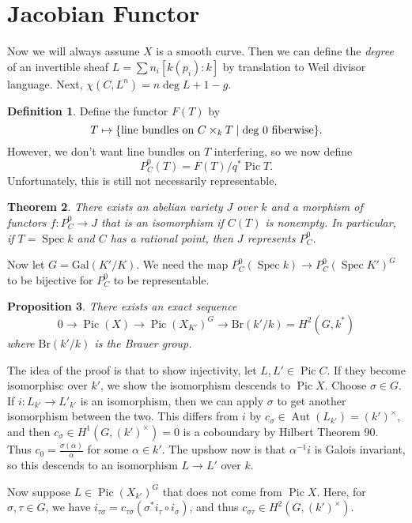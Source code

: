 \documentclass[leqno, openany]{memoir}
\newtheorem{thm}{Theorem}[section]
\newtheorem{prop}[thm]{Proposition}
\theoremstyle{definition}
\newtheorem{defn}[thm]{Definition}
\theoremstyle{remark}
\theoremstyle{plain}
\theoremstyle{definition}
\theoremstyle{remark}
\newcommand{\mr}[1]{\mathrm{#1}}
\DeclareMathOperator{\Aut}{Aut}
\DeclareMathOperator{\Pic}{Pic}
\DeclareMathOperator{\Spec}{Spec}
\begin{document}
\section{Jacobian Functor}%

Now we will always assume $X$ is a smooth curve. Then we can define the
\textit{degree} of an invertible sheaf $L = \sum n_i [k(p_i) : k]$ by
translation to Weil divisor language. Next, $\chi(C, L^n) = n \deg L + 1 - g$.

\begin{defn} Define the functor $F(T)$ by \[ T \mapsto \qty{\text{line bundles
    on }C \times_k T \mid \text{deg $0$ fiberwise}}. \] However, we don't want
    line bundles on $T$ interfering, so we now define \[ P_C^0(T) = F(T) / q^*
    \Pic T. \] Unfortunately, this is still not necessarily representable.
\end{defn}

\begin{thm} There exists an abelian variety $J$ over $k$ and a morphism of
    functors $f \colon P_C^0 \to J$ that is an isomorphism if $C(T)$ is
    nonempty. In particular, if $T = \Spec k$ and $C$ has a rational point,
    then $J$ represents $P_C^0$.  \end{thm}

Now let $G = \mr{Gal}(K'/K)$. We need the map $P_C^0(\Spec k) \to P_C^0(\Spec
K')^G$ to be bijective for $P_C^0$ to be representable.

\begin{prop} There exists an exact sequence \[ 0 \to \Pic(X) \to \Pic(X_{K'})^G
\to \mr{Br}(k'/k) = H^2(G, k^*) \] where $\mr{Br}(k'/k)$ is the Brauer group.
\end{prop}

The idea of the proof is that to show injectivity, let $L, L' \in \Pic C$. If
they become isomorphisc over $k'$, we show the isomorphism descends to $\Pic
X$. Choose $\sigma \in G$. If $i \colon L_{k'} \to L'_{k'}$ is an isomorphism,
then we can apply $\sigma$ to get another isomorphism between the two. This
differs from $i$ by $c_{\sigma} \in \Aut(L_{k'}) = (k')^{\times}$, and then
$c_{\sigma} \in H^1(G, (k')^{\times}) = 0$ is a coboundary by Hilbert Theorem
90. Thus $c_0 = \frac{\sigma(\alpha)}{\alpha}$ for some $\alpha \in k'$. The
upshow now is that $\alpha^{-1} i$ is Galois invariant, so this descends to an
isomorphism $L \to L'$ over $k$.

Now suppose $L \in \Pic {(X_{k'})}^G$ that does not come from $\Pic X$. Here,
for $\sigma, \tau \in G$, we have $i_{\tau\sigma} = c_{\tau\sigma}
(\sigma^*i_{\tau} \circ i_{\sigma})$, and thus $c_{\sigma \tau} \in H^2(G,
{(k')}^{\times})$.
\end{document}
